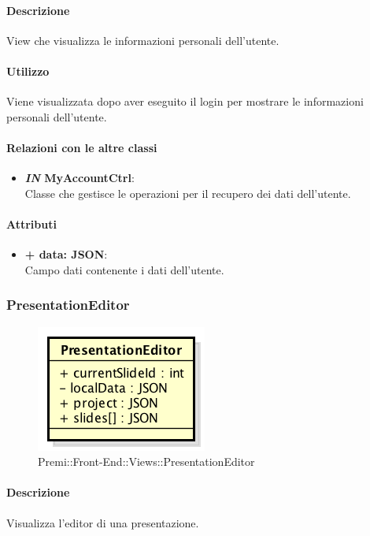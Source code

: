 	\paragraph{Descrizione}
	View che visualizza le informazioni personali dell'utente.
	
	\paragraph{Utilizzo}
	Viene visualizzata dopo aver eseguito il login per mostrare le informazioni personali dell'utente.
	
	\paragraph{Relazioni con le altre classi}
	\begin{itemize}
		\item \textbf{\textit{IN} MyAccountCtrl}:\\
		Classe che gestisce le operazioni per il recupero dei dati dell'utente.
	\end{itemize}
	
	\paragraph{Attributi}
	\begin{itemize}
		\item \textbf{+ data: JSON}:\\
		Campo dati contenente i dati dell'utente.
	\end{itemize}
\newpage
	
	
\subsubsection{PresentationEditor}
	\begin{figure}[h]
		\centering
		\includegraphics[width=0.3\linewidth]{img/premi_front_end_views_presentationeditor}
		\caption[Premi::Front-End::Views::PresentationEditor]{Premi::Front-End::Views::PresentationEditor}
	\end{figure}
	
	\paragraph{Descrizione}
	Visualizza l'editor di una presentazione.
	
